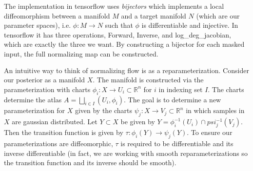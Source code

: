 The implementation in tensorflow uses \textit{bijectors} which implements a local diffeomorphism between a manifold $M$ and a target manifold $N$ (which are our parameter spaces), i.e. $\phi:M\rightarrow N$ such that $\phi$ is differentiable and injective. 
In tensorflow it has three operations, Forward, Inverse, and log\_deg\_jacobian, which are exactly the three we want. 
By constructing a bijector for each masked input, the full normalizing map can be constructed.

An intuitive way to think of normalizing flow is as a reparameterization. Consider our posterior as a manifold $X$. The manifold is constructed via the parameterization with charts $\phi_i:X\rightarrow U_i \subset \mathbb{R}^n$ for $i$ in indexing set $I$. 
The charts determine the atlas $A = \bigsqcup\limits_{i\in I} (U_i,\phi_i)$. 
The goal is to determine a new parameterization for $X$ given by the charts $\psi_j:X\rightarrow V_j \subset \mathbb{R}^n$ in which samples in $X$ are gaussian distributed. 
Let $Y \subset X$ be given by $Y = \phi_i^{-1}(U_i) \cap psi_j^{-1}(V_j)$. 
Then the transition function is given by $\tau:\phi_i(Y)\rightarrow\psi_j(Y)$. 
To ensure our parameterizations are diffeomorphic, $\tau$ is required to be differentiable and its inverse differentiable 
(in fact, we are working with smooth reparameterizations so the transition function and its inverse should be smooth).

